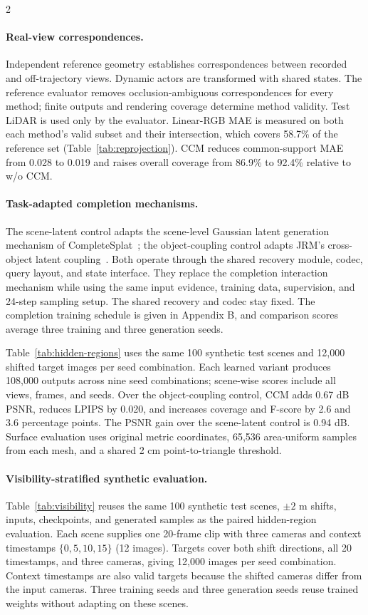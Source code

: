 \begin{multicols}{2}
\paragraph{Real-view correspondences.}
Independent reference geometry establishes correspondences between recorded and off-trajectory views. Dynamic actors are transformed with shared states. The reference evaluator removes occlusion-ambiguous correspondences for every method; finite outputs and rendering coverage determine method validity. Test LiDAR is used only by the evaluator. Linear-RGB MAE is measured on both each method's valid subset and their intersection, which covers 58.7\% of the reference set (Table~\ref{tab:reprojection}). CCM reduces common-support MAE from 0.028 to 0.019 and raises overall coverage from 86.9\% to 92.4\% relative to w/o CCM.

\paragraph{Task-adapted completion mechanisms.}
The scene-latent control adapts the scene-level Gaussian latent generation mechanism of CompleteSplat~\cite{liao2025complete}; the object-coupling control adapts JRM's cross-object latent coupling~\cite{wu2026jrm}. Both operate through the shared recovery module, codec, query layout, and state interface. They replace the completion interaction mechanism while using the same input evidence, training data, supervision, and 24-step sampling setup. The shared recovery and codec stay fixed. The completion training schedule is given in Appendix B, and comparison scores average three training and three generation seeds.

Table~\ref{tab:hidden-regions} uses the same 100 synthetic test scenes and 12,000 shifted target images per seed combination. Each learned variant produces 108,000 outputs across nine seed combinations; scene-wise scores include all views, frames, and seeds. Over the object-coupling control, CCM adds 0.67 dB PSNR, reduces LPIPS by 0.020, and increases coverage and F-score by 2.6 and 3.6 percentage points. The PSNR gain over the scene-latent control is 0.94 dB. Surface evaluation uses original metric coordinates, 65,536 area-uniform samples from each mesh, and a shared 2 cm point-to-triangle threshold.

\paragraph{Visibility-stratified synthetic evaluation.}
Table~\ref{tab:visibility} reuses the same 100 synthetic test scenes, $\pm2$ m shifts, inputs, checkpoints, and generated samples as the paired hidden-region evaluation. Each scene supplies one 20-frame clip with three cameras and context timestamps $\{0,5,10,15\}$ (12 images). Targets cover both shift directions, all 20 timestamps, and three cameras, giving 12,000 images per seed combination. Context timestamps are also valid targets because the shifted cameras differ from the input cameras. Three training seeds and three generation seeds reuse trained weights without adapting on these scenes.


\end{multicols}
